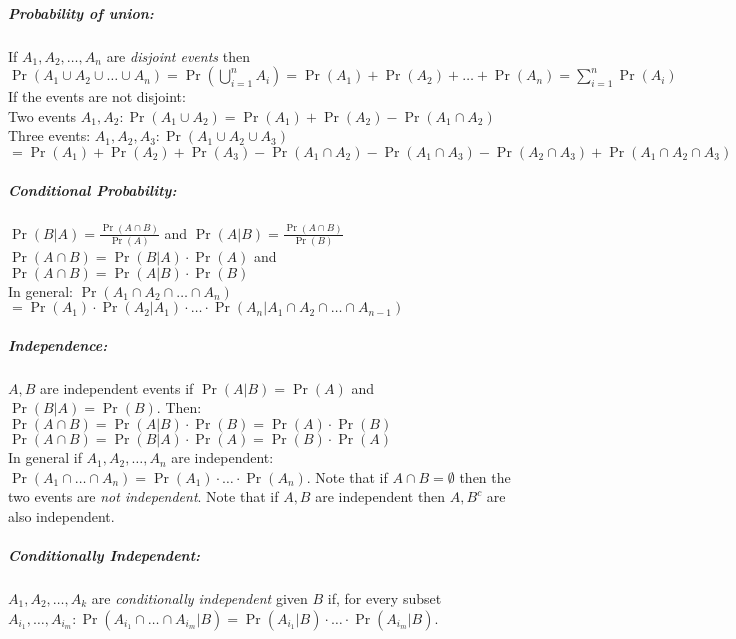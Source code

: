 \documentclass[landscape,10pt]{article}
\begin{document}
    \footnotesize
    \begin{multicols}{4}
    \setlength{\premulticols}{1pt}
    \setlength{\postmulticols}{1pt}
    \setlength{\multicolsep}{1pt}
    \setlength{\columnsep}{2pt}

    \subparagraph*{Probability of union:}
        If \(A_1, A_2, \ldots, A_n\) are \textit{disjoint events} then \(\Pr(A_1 \cup A_2 \cup \ldots \cup A_n) = \Pr(\bigcup\limits_{i=1}^{n}A_i) = \Pr(A_1) + \Pr(A_2) + \ldots + \Pr(A_n) = \sum\limits_{i=1}^{n}\Pr(A_i) \)
        \smallskip
    If the events are not disjoint: \\
     Two events \(A_1, A_2: \Pr(A_1 \cup A_2) = \Pr(A_1) + \Pr(A_2) - \Pr(A_1 \cap A_2)\)\\
    Three events: \(A_1, A_2, A_3: \Pr(A_1 \cup A_2 \cup A_3)\)
    \(= \Pr(A_1) + \Pr(A_2) + \Pr(A_3) - \Pr(A_1 \cap A_2) - \Pr(A_1 \cap A_3) - \Pr(A_2 \cap A_3) + \Pr(A_1 \cap A_2 \cap A_3)\)
    
    \subparagraph*{Conditional Probability: }
    \(\Pr(B|A) = \frac{\Pr(A\cap B)}{\Pr(A)}\) and \(\Pr(A|B) = \frac{\Pr(A \cap B)}{\Pr(B)}\) \\
    \(\Pr(A \cap B) = \Pr(B|A) \cdot \Pr(A)\) and  \\
    \(\Pr(A \cap B) = \Pr(A|B) \cdot \Pr(B)\)  \\
    In general: \(\Pr(A_1 \cap A_2 \cap \ldots \cap A_n) \)\\
    \(= \Pr(A_1) \cdot \Pr(A_2 | A_1) \cdot \ldots \cdot \Pr(A_n | A_1 \cap A_2 \cap \ldots \cap A_{n-1})\)
    
    \subparagraph*{Independence:}
        \(A, B\) are independent events if \(\Pr(A|B) = \Pr(A)\) and \(\Pr(B|A) = \Pr(B)\). Then: \\
        \(\Pr(A \cap B) = \Pr(A|B) \cdot \Pr(B) = \Pr(A) \cdot \Pr(B)\) \\
        \(\Pr(A \cap B) = \Pr(B | A) \cdot \Pr(A) = \Pr(B) \cdot \Pr(A)\)\\
        In general if \(A_1, A_2, \ldots, A_n\) are independent: \(\Pr(A_1 \cap \ldots \cap A_n) = \Pr(A_1) \cdot \ldots \cdot \Pr(A_n)\). Note that if \(A \cap B = \emptyset\) then the two events are \textit{not independent}.  Note that if \(A, B\) are independent then \(A, B^c\) are also independent.

    \subparagraph*{Conditionally Independent: } 
        \(A_1, A_2, \ldots, A_k\) are \textit{conditionally independent} given \(B\) if, for every subset \(A_{i_1}, \ldots, A_{i_m}: \Pr(A_{i_1} \cap \ldots \cap A_{i_m} | B) = \Pr(A_{i_1} | B) \cdot \ldots \cdot \Pr(A_{i_m} | B)\).


\end{multicols}
\end{document}
